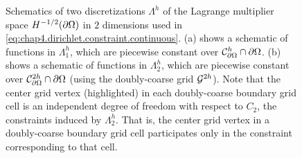 \setlength{\figurewidth}{0.50\textwidth}
\begin{figure}[htb]
\centering
{}
\caption{Schematics of two discretizations $\Lambda^h$ of the Lagrange multiplier space $H^{-1/2}(\partial\Omega)$ in $2$ dimensions used in \eqref{eq:chap4.dirichlet.constraint.continuous}. (a) shows a schematic of functions in $\Lambda^h_1$, which are piecewise constant over $\mathcal{C}^h_{\partial\Omega} \cap \partial\Omega$. (b) shows a schematic of functions in $\Lambda^h_2$, which are piecewise constant over $\mathcal{C}^{2h}_{\partial\Omega} \cap \partial\Omega$ (using the doubly-coarse grid $\mathcal{G}^{2h}$). Note that the center grid vertex (highlighted) in each doubly-coarse boundary grid cell is an independent degree of freedom with respect to $C_2$, the constraints induced by $\Lambda^h_2$. That is, the center grid vertex in a doubly-coarse boundary grid cell participates only in the constraint corresponding to that cell.}
\label{fig:chap4.lambdah}
\end{figure}

